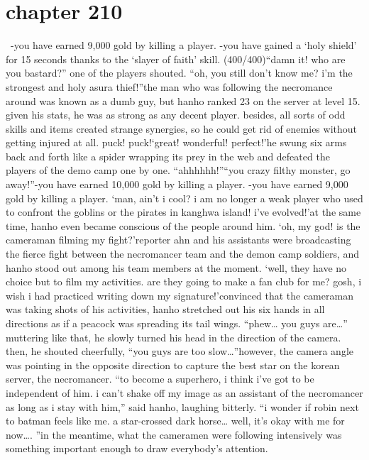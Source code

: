 \section{chapter 210}






 -you have earned 9,000 gold by killing a player.
-you have gained a ‘holy shield’ for 15 seconds thanks to the ‘slayer of faith’ skill.
 (400/400)“damn it! who are you bastard?” one of the players shouted.
“oh, you still don’t know me? i’m the strongest and holy asura thief!”the man who was following the necromance around was known as a dumb guy, but hanho ranked 23 on the server at level 15.
given his stats, he was as strong as any decent player.
 besides, all sorts of odd skills and items created strange synergies, so he could get rid of enemies without getting injured at all.
puck! puck!‘great! wonderful! perfect!’he swung six arms back and forth like a spider wrapping its prey in the web and defeated the players of the demo camp one by one.
“ahhhhhh!”“you crazy filthy monster, go away!”-you have earned 10,000 gold by killing a player.
-you have earned 9,000 gold by killing a player.
‘man, ain’t i cool? i am no longer a weak player who used to confront the goblins or the pirates in kanghwa island! i’ve evolved!’at the same time, hanho even became conscious of the people around him.
‘oh, my god! is the cameraman filming my fight?’reporter ahn and his assistants were broadcasting the fierce fight between the necromancer team and the demon camp soldiers, and hanho stood out among his team members at the moment.
‘well, they have no choice but to film my activities.
 are they going to make a fan club for me? gosh, i wish i had practiced writing down my signature!’convinced that the cameraman was taking shots of his activities, hanho stretched out his six hands in all directions as if a peacock was spreading its tail wings.
“phew… you guys are…”
muttering like that, he slowly turned his head in the direction of the camera.
then, he shouted cheerfully, “you guys are too slow…”however, the camera angle was pointing in the opposite direction to capture the best star on the korean server, the necromancer.
“to become a superhero, i think i’ve got to be independent of him.
 i can’t shake off my image as an assistant of the necromancer as long as i stay with him,” said hanho, laughing bitterly.
“i wonder if robin next to batman feels like me.
 a star-crossed dark horse… well, it’s okay with me for now….
”in the meantime, what the cameramen were following intensively was something important enough to draw everybody’s attention.
